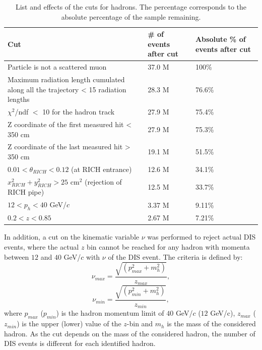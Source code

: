 \begin{table}[!h]
  \centering
  \caption{List and effects of the cuts for hadrons. The percentage corresponds to the absolute percentage of the sample remaining.}
  \label{pic:Hadroncuts}
  \begin{tabular}{p{10cm} p{2cm} p{2cm}}
    \hline
    \hline
     Cut & \# of events after cut & Absolute \% of events after cut  \\
    \hline
    \hline
    Particle is not a scattered muon & 37.0 M & 100\% \\
    Maximum radiation length cumulated along all the trajectory < 15 radiation lengths & 28.3 M & 76.6\% \\
    $\chi^2$/ndf $<$ 10 for the hadron track & 27.9 M & 75.4\% \\
    Z coordinate of the first measured hit < 350 cm & 27.9 M & 75.3\% \\
    Z coordinate of the last measured hit > 350 cm & 19.1 M & 51.5\% \\
    $0.01 < \theta_{RICH} < 0.12$ (at RICH entrance) & 12.6 M & 34.1\% \\
    $x^2_{RICH} + y^2_{RICH} > 25$ cm$^2$ (rejection of RICH pipe) & 12.5 M & 33.7\% \\
    $12 < p_h < 40$ GeV/$c$ & 3.37 M & 9.11\% \\
    $0.2 < z < 0.85$ & 2.67 M & 7.21\% \\
    \hline
    \hline
  \end{tabular}
\end{table}

In addition, a cut on the kinematic variable $\nu$ was performed to reject actual DIS events, where the actual $z$ bin cannot be reached for any hadron with momenta between $12$ and $40$ GeV/$c$ with $\nu$ of the DIS event. The criteria is defined by:
%
\begin{equation}
  \nu_{max} = \frac{\sqrt{(p^2_{max}+m^2_h)}}{z_{max}},
\end{equation}
\begin{equation}
  \nu_{min} = \frac{\sqrt{(p^2_{min}+m^2_h)}}{z_{min}},
\end{equation}
%
where $p_{max}$ ($p_{min}$) is the hadron momentum limit of $40$ GeV/$c$ ($12$ GeV/c), $z_{max}$ ($z_{min}$) is the upper (lower) value of the $z$-bin and $m_h$ is the mass of the considered hadron. As the cut depends on the mass of the considered hadron, the number of DIS events is different for each identified hadron.


